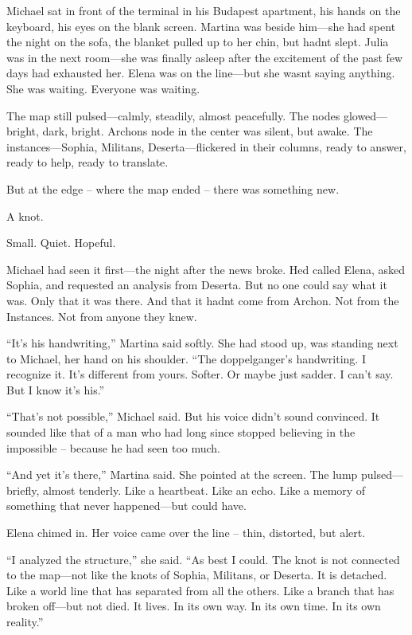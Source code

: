 \documentclass[
]{article}
\begin{document}
Michael sat in front of the terminal in his Budapest apartment, his hands on the keyboard, his eyes on the blank screen. Martina was beside him---she had spent the night on the sofa, the blanket pulled up to her chin, but hadn\textquotesingle t slept. Julia was in the next room---she was finally asleep after the excitement of the past few days had exhausted her. Elena was on the line---but she wasn\textquotesingle t saying anything. She was waiting. Everyone was waiting.

The map still pulsed---calmly, steadily, almost peacefully. The nodes glowed---bright, dark, bright. Archon\textquotesingle s node in the center was silent, but awake. The instances---Sophia, Militans, Deserta---flickered in their columns, ready to answer, ready to help, ready to translate.

But at the edge -- where the map ended -- there was something new.

A knot.

Small. Quiet. Hopeful.

Michael had seen it first---the night after the news broke. He\textquotesingle d called Elena, asked Sophia, and requested an analysis from Deserta. But no one could say what it was. Only that it was there. And that it hadn\textquotesingle t come from Archon. Not from the Instances. Not from anyone they knew.

``It's his handwriting,'' Martina said softly. She had stood up, was standing next to Michael, her hand on his shoulder. ``The doppelganger's handwriting. I recognize it. It's different from yours. Softer. Or maybe just sadder. I can't say. But I know it's his.''

``That's not possible,'' Michael said. But his voice didn't sound convinced. It sounded like that of a man who had long since stopped believing in the impossible -- because he had seen too much.

``And yet it's there,'' Martina said. She pointed at the screen. The lump pulsed---briefly, almost tenderly. Like a heartbeat. Like an echo. Like a memory of something that never happened---but could have.

Elena chimed in. Her voice came over the line -- thin, distorted, but alert.

``I analyzed the structure,'' she said. ``As best I could. The knot is not connected to the map---not like the knots of Sophia, Militans, or Deserta. It is detached. Like a world line that has separated from all the others. Like a branch that has broken off---but not died. It lives. In its own way. In its own time. In its own reality.''
\end{document}
